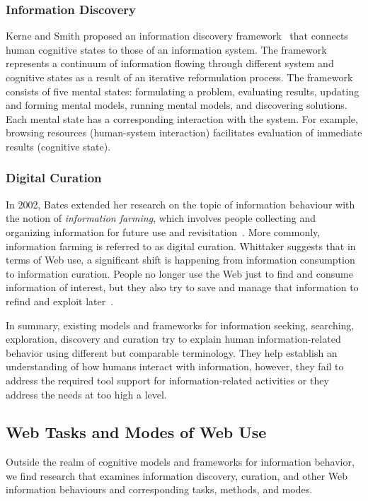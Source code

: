\documentclass{sigchi}
\begin{document}
\subsubsection{Information Discovery}
Kerne and Smith proposed an information discovery framework~\cite{kerne2004information} that connects human cognitive states 
to those of an information system. The framework represents a continuum of information flowing through different system and cognitive states as a result of an iterative reformulation process. The framework consists of five mental states: formulating a problem, evaluating results, updating and forming mental models, running mental models, and discovering solutions. Each mental state has a corresponding interaction with the system. For example, browsing resources (human-system interaction) facilitates evaluation of immediate results (cognitive state). 
   
\subsubsection{Digital Curation}
In 2002, Bates extended her research on the topic of information behaviour with the notion of \textit{information farming}, which involves people collecting and organizing information for future use and revisitation~\cite{bates2002toward}. More commonly, information farming is referred to as digital curation. Whittaker suggests that in terms of Web use, a significant shift is happening from information consumption to information curation. People no longer use the Web just to find and consume information of interest, but they also try to save and manage that information to refind and exploit later~\cite{whittaker2011personal}. 

In summary, existing models and frameworks for information seeking, searching, exploration, discovery and curation try to explain human information-related behavior using different but comparable terminology. They help establish an understanding of how humans interact with information, however, they fail to address the required tool support for information-related activities or they address the needs at too high a level.  

\subsection{Web Tasks and Modes of Web Use}
Outside the realm of cognitive models and frameworks for information behavior, we find research that examines information discovery, curation, and other Web information behaviours and corresponding tasks, methods, and modes.
\end{document}

